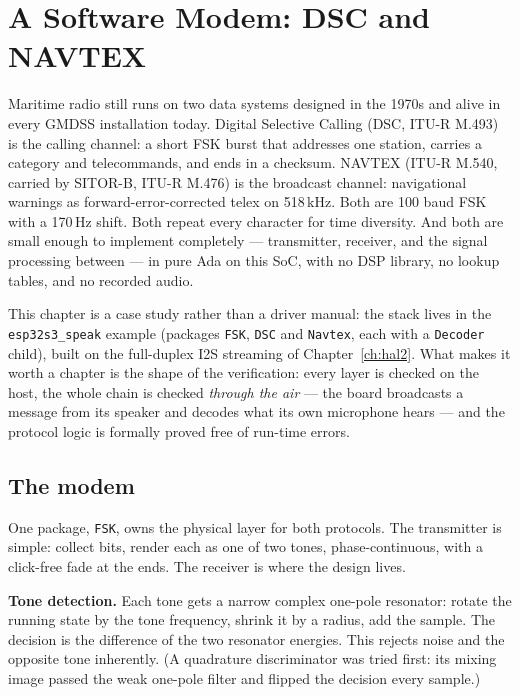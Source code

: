 \chapter{A Software Modem: DSC and NAVTEX}
\label{ch:softmodem}

Maritime radio still runs on two data systems designed in the 1970s and alive
in every GMDSS installation today. Digital Selective Calling (DSC, ITU-R
M.493) is the calling channel: a short FSK burst that addresses one station,
carries a category and telecommands, and ends in a checksum. NAVTEX (ITU-R
M.540, carried by SITOR-B, ITU-R M.476) is the broadcast channel: navigational
warnings as forward-error-corrected telex on 518\,kHz. Both are 100 baud FSK
with a 170\,Hz shift. Both repeat every character for time diversity. And both
are small enough to implement completely --- transmitter, receiver, and the
signal processing between --- in pure Ada on this SoC, with no DSP library, no
lookup tables, and no recorded audio.

This chapter is a case study rather than a driver manual: the stack lives in
the \texttt{esp32s3\_speak} example (packages \texttt{FSK}, \texttt{DSC} and
\texttt{Navtex}, each with a \texttt{Decoder} child), built on the full-duplex
I2S streaming of Chapter~\ref{ch:hal2}. What makes it worth a chapter is the
shape of the verification: every layer is checked on the host, the whole chain
is checked \emph{through the air} --- the board broadcasts a message from its
speaker and decodes what its own microphone hears --- and the protocol logic
is formally proved free of run-time errors.

\section{The modem}

One package, \texttt{FSK}, owns the physical layer for both protocols. The
transmitter is simple: collect bits, render each as one of two tones,
phase-continuous, with a click-free fade at the ends. The receiver is where
the design lives.

\textbf{Tone detection.} Each tone gets a narrow complex one-pole resonator:
rotate the running state by the tone frequency, shrink it by a radius, add the
sample. The decision is the difference of the two resonator energies. This
rejects noise and the opposite tone inherently. (A quadrature discriminator
was tried first: its mixing image passed the weak one-pole filter and flipped
the decision every sample.)

